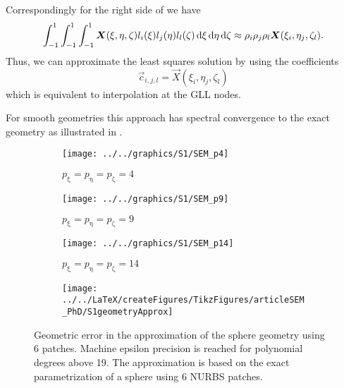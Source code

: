 Correspondingly for the right side of  we have
\begin{equation*}
	\int_{-1}^1\int_{-1}^1\int_{-1}^1 \vec{X}(\xi,\eta,\zeta)l_i(\xi)l_j(\eta)l_l(\zeta)\idiff\xi\idiff\eta\idiff\zeta \approx \rho_i\rho_j\rho_l \vec{X}(\xi_i,\eta_j,\zeta_l).
\end{equation*}
Thus, we can approximate the least squares solution by using the coefficients
\begin{equation*}
	\vec{c}_{i,j,l} = \vec{X}(\xi_i,\eta_j,\zeta_l)
\end{equation*}
which is equivalent to interpolation at the GLL nodes.

For smooth geometries this approach has spectral convergence to the exact geometry as illustrated in .
\begin{figure}
	\centering
	\begin{subfigure}[t]{0.28\textwidth}
		\centering
		\texttt{[image: ../../graphics/S1/SEM\_p4]}
		\caption{$p_\upxi=p_\upeta=p_\upzeta=4$}
	\end{subfigure}%
	\hspace*{0.01\textwidth}%
	\begin{subfigure}[t]{0.28\textwidth}
		\centering
		\texttt{[image: ../../graphics/S1/SEM\_p9]}
		\caption{$p_\upxi=p_\upeta=p_\upzeta=9$}
	\end{subfigure}%
	\hspace*{0.01\textwidth}%
	\begin{subfigure}[t]{0.28\textwidth}
		\centering
		\texttt{[image: ../../graphics/S1/SEM\_p14]}
		\caption{$p_\upxi=p_\upeta=p_\upzeta=14$}
	\end{subfigure}%
	\hspace*{0.01\textwidth}%
	\begin{subfigure}[t]{0.1\textwidth}
		\centering
		\texttt{[image: ../../LaTeX/createFigures/TikzFigures/articleSEM\_PhD/S1geometryApprox]}
	\end{subfigure}
	\caption{Geometric error in the approximation of the sphere geometry using 6 patches. Machine epsilon precision is reached for polynomial degrees above 19. The approximation is based on the exact parametrization of a sphere using 6 NURBS patches.}
	\label{Fig5:spectralGeomteryApprox}
\end{figure}